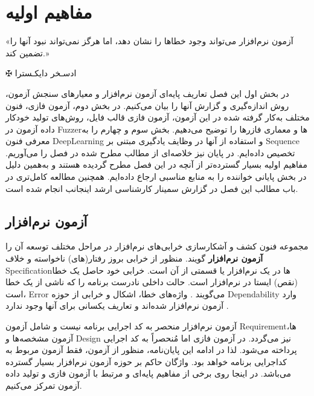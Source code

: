 
\chapter{مفاهیم اولیه}\label{chapter2}
\thispagestyle{empty}

\epigraph{
	«آزمون نرم‌افزار می‌تواند وجود خطاها را نشان دهد، اما هرگز نمی‌تواند نبود آنها را تضمین کند.»
}
{$ \maltese $ {\large ادسـخر دایکـسترا}}


\noindent
در بخش اول این فصل تعاریف پایه‌ای آزمون نرم‌افزار و معیارهای سنجش آزمون، روش اندازه‌گیری و گزارش آنها را بیان می‌کنیم.
در بخش دوم، آزمون فازی، فنون مختلف به‌کار گرفته شده در این آزمون، آزمون فازی قالب فایل، روش‌های تولید خودکار داده آزمون در \gls{Fuzzer}ها و معماری فازرها را توضیح می‌دهیم. بخش سوم و چهارم را به معرفی فنون \gls{DeepLearning} و استفاده از آنها در وظایف یادگیری مبتنی بر \gls{Sequence} تخصیص داده‌ایم. در پایان نیز خلاصه‌ای از مطالب مطرح شده در فصل را می‌آوریم. مفاهیم اولیه بسیار گسترده‌تر از آنچه در این فصل مطرح گردیده هستند و به‌همین دلیل در بخش پایانی خواننده را به منابع مناسبی ارجاع داده‌ایم. همچنین مطالعه کامل‌تری در باب مطالب این فصل در گزارش سمینار کارشناسی ارشد اینجانب 
\cite{ZakeriSeminar2017}
انجام شده است.  



\section{آزمون نرم‌افزار}\label{software_testing}
مجموعه فنون کشف و آشکارسازی خرابی‌های نرم‌افزار در مراحل مختلف توسعه آن را
\textbf{آزمون نرم‌افزار}
گویند. منظور از خرابی بروز رفتار(های) ناخواسته و خلاف \gls{Specification}ها در یک نرم‌افزار یا قسمتی از آن است. خرابی خود حاصل یک خطا (نقص) ایستا در نرم‌افزار است. حالت داخلی نادرست برنامه را که ناشی از یک خطا است،  \gls{Error} می‌گویند
 \cite{ammann2016introduction}. واژه‌های خطا، اشکال و خرابی از حوزه \gls{Dependability} وارد آزمون نرم‌افزار شده‌اند
  \cite{Dubrova:2013:FD:2462571} و تعاریف یکسانی برای آنها وجود ندارد
  \cite{PaulC.Jorgensen2014,ammann2016introduction}.
  
  
  آزمون نرم‌افزار منحصر به کد اجرایی برنامه نیست و شامل آزمون \gls{Requirement}ها، آزمون مشخصه‌ها و \gls{Design} نیز می‌گردد. در آزمون فازی اما مُنحصراً به کد اجرایی پرداخته می‌شود. لذا در ادامه این پایان‌نامه، منظور از آزمون، فقط آزمون مربوط به کداجرایی برنامه خواهد بود. واژگان حاکم بر حوزه آزمون نرم‌افزار بسیار گسترده می‌باشد. در اینجا روی برخی از مفاهیم پایه‌ای‌ و مرتبط با آزمون فازی و تولید داده آزمون تمرکز می‌کنیم.
 
